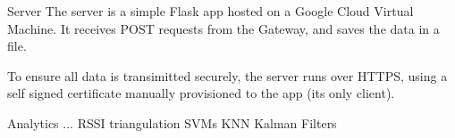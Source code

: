 \documentclass[landscape]{infslides}
\begin{document}
\begin{slide}{Server}
The server is a simple Flask app hosted on a Google Cloud Virtual Machine. It receives POST requests from the Gateway, and saves the data in a file.

To ensure all data is transimitted securely, the server runs over HTTPS, using a self signed certificate manually provisioned to the app (its only client).
\end{slide}
\begin{slide}{Analytics}
    ...
    RSSI triangulation 
    SVMs
    KNN
    Kalman Filters
\end{slide}
\end{document}
